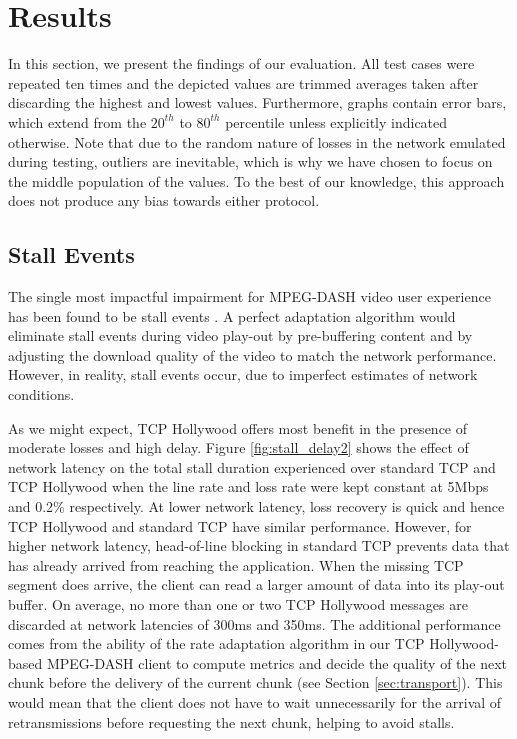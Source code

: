 \section{Results}
\label{sec:testing} 

In this section, we present the findings of our evaluation. All test cases were repeated
ten times and the depicted values are trimmed averages taken after discarding the highest
and lowest values. Furthermore, graphs contain error bars, which extend from the $20^{th}$ to $80^{th}$ percentile unless explicitly indicated otherwise. Note that due to the random nature of losses in the network emulated during testing, outliers are inevitable, which is why we have chosen to focus on the middle population of the values. To the best of our knowledge, this approach does not produce any bias towards either protocol. 

\subsection{Stall Events}
\label{sec:testing-stall}

The single most impactful impairment for MPEG-DASH video user experience has been found to be
stall events \cite{hossfeld2011quantification}. A perfect adaptation algorithm would
eliminate stall events during video play-out by pre-buffering content and by adjusting the
download quality of the video to match the network performance. However, in reality, stall
events occur, due to imperfect estimates of network conditions.

As we might expect, TCP Hollywood offers most benefit in the presence of moderate losses and high
delay. Figure \ref{fig:stall_delay2} shows the effect of network latency on the total
stall duration experienced over standard TCP and TCP Hollywood when the line rate and loss
rate were kept constant at 5Mbps and 0.2\% respectively. At lower network latency, loss
recovery is quick and hence TCP Hollywood and standard TCP have similar performance.
However, for higher network latency, head-of-line blocking in standard TCP prevents data
that has already arrived from reaching the application. When the missing TCP segment does
arrive, the client can read a larger amount of data into its play-out buffer. On average,
no more than one or two TCP Hollywood messages are discarded at network latencies of 300ms and
350ms. The additional performance comes from the ability of the rate adaptation algorithm in 
our TCP Hollywood-based MPEG-DASH client to compute metrics and decide the quality of the 
next chunk before the delivery of the current chunk (see Section \ref{sec:transport}). 
This would mean that the client does not have to wait unnecessarily for the arrival of 
retransmissions before requesting the next chunk, helping to avoid stalls.

